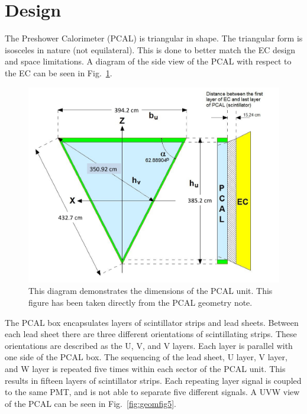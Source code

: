 \FloatBarrier
\section{Design}
The Preshower Calorimeter (PCAL) is triangular in shape. The triangular form is isosceles in nature (not equilateral). This is done 
to better match the EC design and space limitations. A diagram of the side view of the PCAL with respect to the EC can be seen in 
Fig.~\ref{fig:geomfig1}. 

\begin{figure}[h]
    \centering
    \includegraphics[width= 5in, keepaspectratio = true]{Pcal_geom_fig1}
    \caption{This diagram demonstrates the dimensions of the PCAL unit. This figure has been taken directly from the PCAL 
    geometry note\cite{bib:geomnote}.}
    \label{fig:geomfig1}
\end{figure}

The PCAL box encapsulates layers of scintillator strips and lead sheets. Between each lead sheet there are three different 
orientations of scintillating strips. These orientations are described as the U, V, and V layers. Each layer is parallel 
with one side of the PCAL box. The sequencing of the lead sheet, U layer, V layer, and W layer is repeated five times within
each sector of the PCAL unit. This results in fifteen layers of scintillator strips. Each repeating layer signal is coupled 
to the same PMT, and  is not able to separate five different signals. A UVW view of the PCAL can be seen in Fig.~\ref{fig:geomfig5}.


